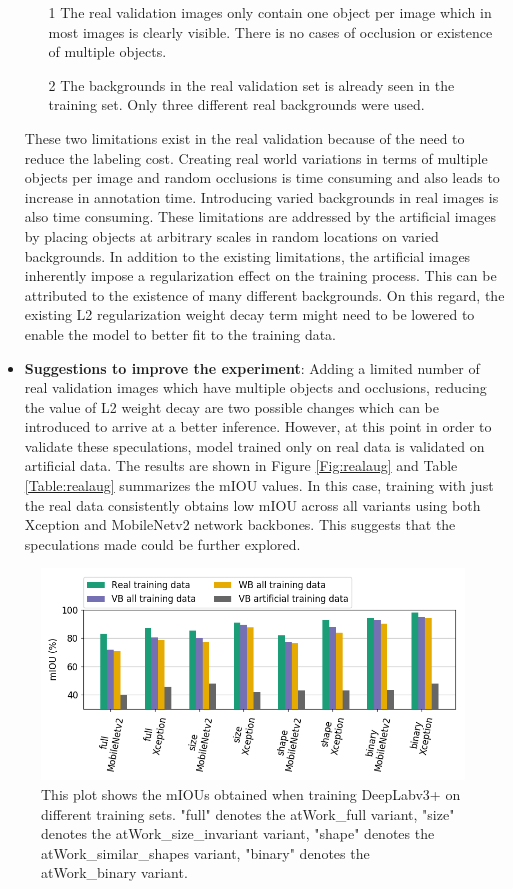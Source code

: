 \begin{itemize}
		\begin{itemize}
			\item[1] The real validation images only contain one object per image which in most images is clearly visible. There is no cases of occlusion or existence of multiple objects. 
			\item[2] The backgrounds in the real validation set is already seen in the training set. Only three different real backgrounds were used.
		\end{itemize}
		These two limitations exist in the real validation because of the need to reduce the labeling cost. Creating real world variations in terms of multiple objects per image and random occlusions is time consuming and also leads to increase in annotation time. Introducing varied backgrounds in real images is also time consuming. These limitations are addressed by the artificial images by placing objects at arbitrary scales in random locations on varied backgrounds.
		In addition to the existing limitations, the artificial images inherently impose a regularization effect on the training process. This can be attributed to the existence of many different backgrounds. On this regard, the existing L2 regularization weight decay term might need to be lowered to enable the model to better fit to the training data.
		\item \textbf{Suggestions to improve the experiment}: Adding a limited number of real validation images which have multiple objects and occlusions, reducing the value of L2 weight decay are two possible changes which can be introduced to arrive at a better inference. However, at this point in order to validate these speculations, model trained only on real data is validated on artificial data. The results are shown in Figure \ref{Fig:realaug} and Table \ref{Table:realaug} summarizes the mIOU values. In this case, training with just the real data consistently obtains low mIOU across all variants using both Xception and MobileNetv2 network backbones. This suggests that the speculations made could be further explored.
	\end{itemize}
	
	\begin{figure}
		\centering
		\includegraphics[width=1\linewidth]{images/real_val}
		\caption{This plot shows the mIOUs obtained when training DeepLabv3+ on different training sets. "full" denotes the atWork\_full variant, "size" denotes the atWork\_size\_invariant variant, "shape" denotes the atWork\_similar\_shapes variant, "binary" denotes the atWork\_binary variant.}
		\label{Fig:realval}
	\end{figure}

